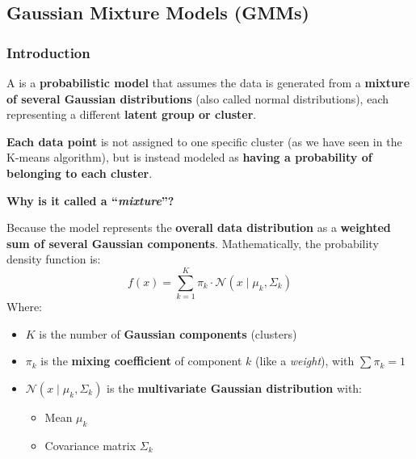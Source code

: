 \subsection{Gaussian Mixture Models (GMMs)}

\subsubsection{Introduction}

A  is a \textbf{probabilistic model} that assumes the data is generated from a \textbf{mixture of several Gaussian distributions} (also called normal distributions), each representing a different \textbf{latent group or cluster}.

\highspace
\textbf{Each data point} is not assigned to one specific cluster (as we have seen in the K-means algorithm), but is instead modeled as \textbf{having a probability of belonging to each cluster}.

\highspace
\begin{flushleft}
    \textcolor{Green3}{ \textbf{Why is it called a ``\emph{mixture}''?}}
\end{flushleft}
Because the model represents the \textbf{overall data distribution} as a \textbf{weighted sum of several Gaussian components}. Mathematically, the probability density function is:
\begin{equation}
    f\left(x\right) = \displaystyle\sum_{k=1}^{K} \pi_{k} \cdot \mathcal{N}\left(x \mid \mu_{k}, \Sigma_{k}\right)
\end{equation}
Where:
\begin{itemize}
    \item $K$ is the number of \textbf{Gaussian components} (clusters)
    \item $\pi_{k}$ is the \textbf{mixing coefficient} of component $k$ (like a \emph{weight}), with $\displaystyle\sum \pi_{k} = 1$
    \item $\mathcal{N}\left(x \mid \mu_{k}, \Sigma_{k}\right)$ is the \textbf{multivariate Gaussian distribution} with:
    \begin{itemize}
        \item Mean $\mu_{k}$
        \item Covariance matrix $\Sigma_{k}$
    \end{itemize}
\end{itemize}

